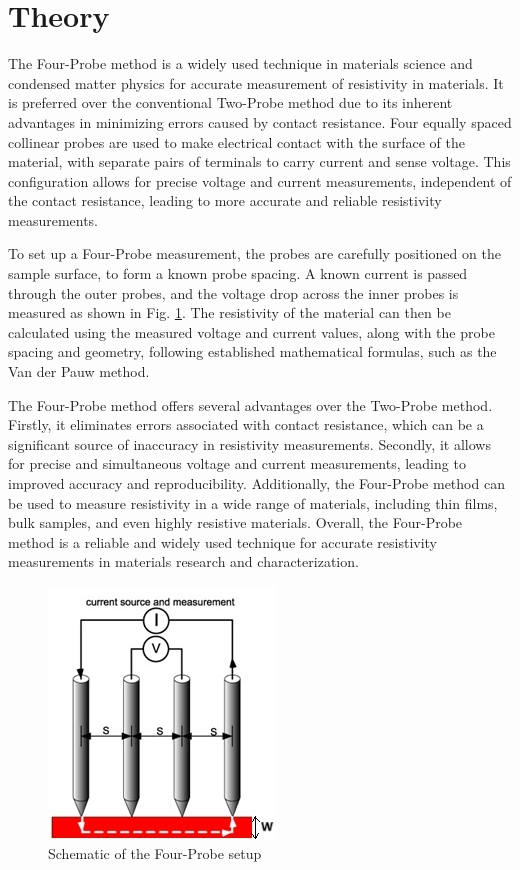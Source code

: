 \section{Theory}
The Four-Probe method is a widely used technique in materials science and condensed matter physics for accurate measurement of resistivity in materials. It is preferred over the conventional Two-Probe method due to its inherent advantages in minimizing errors caused by contact resistance. Four equally spaced collinear probes are used to make electrical contact with the surface of the material, with separate pairs of terminals to carry current and sense voltage. This configuration allows for precise voltage and current measurements, independent of the contact resistance, leading to more accurate and reliable resistivity measurements.

To set up a Four-Probe measurement, the probes are carefully positioned on the sample surface, to form a known probe spacing. A known current is passed through the outer probes, and the voltage drop across the inner probes is measured as shown in Fig. \ref{t1}. The resistivity of the material can then be calculated using the measured voltage and current values, along with the probe spacing and geometry, following established mathematical formulas, such as the Van der Pauw method.
		
The Four-Probe method offers several advantages over the Two-Probe method. Firstly, it eliminates errors associated with contact resistance, which can be a significant source of inaccuracy in resistivity measurements. Secondly, it allows for precise and simultaneous voltage and current measurements, leading to improved accuracy and reproducibility. Additionally, the Four-Probe method can be used to measure resistivity in a wide range of materials, including thin films, bulk samples, and even highly resistive materials. Overall, the Four-Probe method is a reliable and widely used technique for accurate resistivity measurements in materials research and characterization.
		
\begin{figure}
    \centering
    \includegraphics[width=0.5\columnwidth]{images/t1.jpg}
    \caption{Schematic of the Four-Probe setup}
    \label{t1}
\end{figure}

